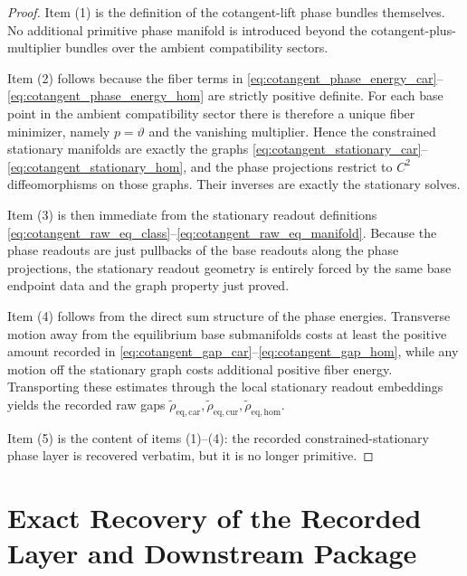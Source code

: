 \documentclass[11pt]{article}
\newcommand{\RawCarGap}{\widetilde\rho_{\mathrm{eq,car}}}
\newcommand{\RawCurGap}{\widetilde\rho_{\mathrm{eq,cur}}}
\newcommand{\RawHomGap}{\widetilde\rho_{\mathrm{eq,hom}}}
\begin{document}
\begin{proof}
Item (1) is the definition of the cotangent-lift phase bundles themselves. No additional primitive phase manifold is introduced beyond the cotangent-plus-multiplier bundles over the ambient compatibility sectors.

Item (2) follows because the fiber terms in \eqref{eq:cotangent_phase_energy_car}--\eqref{eq:cotangent_phase_energy_hom} are strictly positive definite. For each base point in the ambient compatibility sector there is therefore a unique fiber minimizer, namely \(p=\vartheta\) and the vanishing multiplier. Hence the constrained stationary manifolds are exactly the graphs \eqref{eq:cotangent_stationary_car}--\eqref{eq:cotangent_stationary_hom}, and the phase projections restrict to \(C^2\) diffeomorphisms on those graphs. Their inverses are exactly the stationary solves.

Item (3) is then immediate from the stationary readout definitions \eqref{eq:cotangent_raw_eq_class}--\eqref{eq:cotangent_raw_eq_manifold}. Because the phase readouts are just pullbacks of the base readouts along the phase projections, the stationary readout geometry is entirely forced by the same base endpoint data and the graph property just proved.

Item (4) follows from the direct sum structure of the phase energies. Transverse motion away from the equilibrium base submanifolds costs at least the positive amount recorded in \eqref{eq:cotangent_gap_car}--\eqref{eq:cotangent_gap_hom}, while any motion off the stationary graph costs additional positive fiber energy. Transporting these estimates through the local stationary readout embeddings yields the recorded raw gaps \(\RawCarGap,\RawCurGap,\RawHomGap\).

Item (5) is the content of items (1)--(4): the recorded constrained-stationary phase layer is recovered verbatim, but it is no longer primitive.
\end{proof}

\section{Exact Recovery of the Recorded Layer and Downstream Package}
\end{document}
